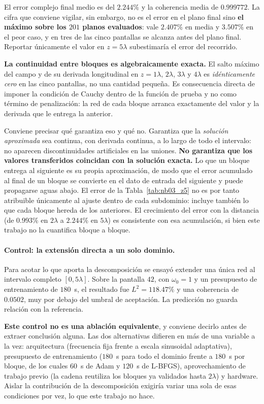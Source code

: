El error complejo final medio es del $2.244\%$ y la coherencia media de
$0.999772$. La cifra que conviene vigilar, sin embargo, no es el error en el
plano final sino \textbf{el máximo sobre los $201$ planos evaluados}: vale
$2.407\%$ en media y $3.507\%$ en el peor caso, y en tres de las cinco pantallas
se alcanza antes del plano final. Reportar únicamente el valor en $z=5\lambda$
subestimaría el error del recorrido.

\textbf{La continuidad entre bloques es algebraicamente exacta.} El salto
máximo del campo y de su derivada longitudinal en $z=1\lambda$, $2\lambda$,
$3\lambda$ y $4\lambda$ es \emph{idénticamente cero} en las cinco pantallas, no
una cantidad pequeña. Es consecuencia directa de imponer la condición de Cauchy
dentro de la función de prueba y no como término de penalización: la red de cada
bloque arranca exactamente del valor y la derivada que le entrega la anterior.

Conviene precisar qué garantiza eso y qué no. Garantiza que la \emph{solución
aproximada} sea continua, con derivada continua, a lo largo de todo el
intervalo: no aparecen discontinuidades artificiales en las uniones.
\textbf{No garantiza que los valores transferidos coincidan con la solución
exacta.} Lo que un bloque entrega al siguiente es su propia aproximación, de
modo que el error acumulado al final de un bloque se convierte en el dato de
entrada del siguiente y puede propagarse aguas abajo. El error de la
Tabla~\ref{tab:nb03_z5} no es por tanto atribuible únicamente al ajuste dentro
de cada subdominio: incluye también lo que cada bloque hereda de los anteriores.
El crecimiento del error con la distancia (de $0.993\%$ en $2\lambda$ a
$2.244\%$ en $5\lambda$) es consistente con esa acumulación, si bien este
trabajo no la cuantifica bloque a bloque.

\paragraph{Control: la extensión directa a un solo dominio.} Para acotar lo que
aporta la descomposición se ensayó extender una única red al intervalo completo
$[0,5\lambda]$. Sobre la pantalla $42$, con $\omega_0=1$ y un presupuesto de
entrenamiento de $180$~s, el resultado fue $L^2=118.47\%$ y una coherencia de
$0.0502$, muy por debajo del umbral de aceptación. La predicción no guarda
relación con la referencia.

\textbf{Este control no es una ablación equivalente}, y conviene decirlo
antes de extraer conclusión alguna. Las dos alternativas difieren en más de
una variable a la vez: arquitectura (frecuencia fija frente a escala
sinusoidal adaptativa), presupuesto de entrenamiento ($180$~s para todo el
dominio frente a $180$~s por bloque, de los cuales $60$~s de Adam y $120$~s de
L-BFGS), aprovechamiento de trabajo previo (la cadena reutiliza los bloques
ya validados hasta $2\lambda$) y hardware. Aislar la contribución de la
descomposición exigiría variar una sola de esas condiciones por vez, lo que
este trabajo no hace.

